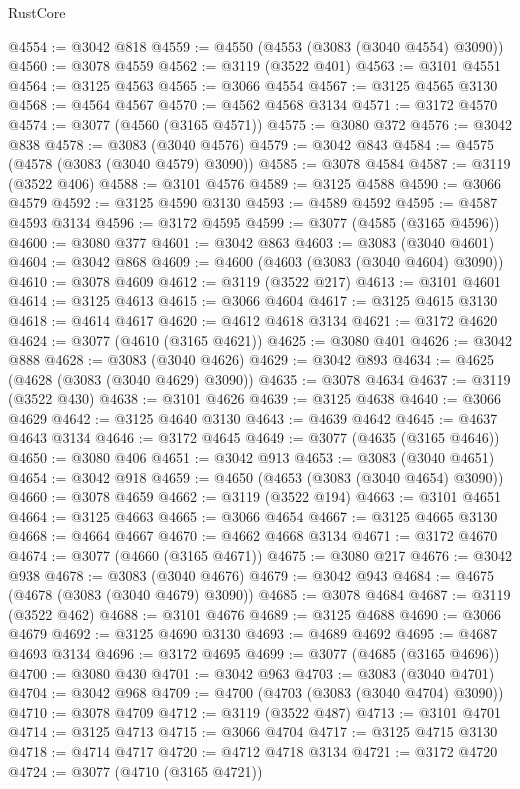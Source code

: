 \begin{lexlean}{RustCore}
\begin{coremodule}
@4554 := @3042 @818
@4559 := @4550 (@4553 (@3083 (@3040 @4554) @3090))
@4560 := @3078 @4559
@4562 := @3119 (@3522 @401)
@4563 := @3101 @4551
@4564 := @3125 @4563
@4565 := @3066 @4554
@4567 := @3125 @4565 @3130
@4568 := @4564 @4567
@4570 := @4562 @4568 @3134
@4571 := @3172 @4570
@4574 := @3077 (@4560 (@3165 @4571))
@4575 := @3080 @372
@4576 := @3042 @838
@4578 := @3083 (@3040 @4576)
@4579 := @3042 @843
@4584 := @4575 (@4578 (@3083 (@3040 @4579) @3090))
@4585 := @3078 @4584
@4587 := @3119 (@3522 @406)
@4588 := @3101 @4576
@4589 := @3125 @4588
@4590 := @3066 @4579
@4592 := @3125 @4590 @3130
@4593 := @4589 @4592
@4595 := @4587 @4593 @3134
@4596 := @3172 @4595
@4599 := @3077 (@4585 (@3165 @4596))
@4600 := @3080 @377
@4601 := @3042 @863
@4603 := @3083 (@3040 @4601)
@4604 := @3042 @868
@4609 := @4600 (@4603 (@3083 (@3040 @4604) @3090))
@4610 := @3078 @4609
@4612 := @3119 (@3522 @217)
@4613 := @3101 @4601
@4614 := @3125 @4613
@4615 := @3066 @4604
@4617 := @3125 @4615 @3130
@4618 := @4614 @4617
@4620 := @4612 @4618 @3134
@4621 := @3172 @4620
@4624 := @3077 (@4610 (@3165 @4621))
@4625 := @3080 @401
@4626 := @3042 @888
@4628 := @3083 (@3040 @4626)
@4629 := @3042 @893
@4634 := @4625 (@4628 (@3083 (@3040 @4629) @3090))
@4635 := @3078 @4634
@4637 := @3119 (@3522 @430)
@4638 := @3101 @4626
@4639 := @3125 @4638
@4640 := @3066 @4629
@4642 := @3125 @4640 @3130
@4643 := @4639 @4642
@4645 := @4637 @4643 @3134
@4646 := @3172 @4645
@4649 := @3077 (@4635 (@3165 @4646))
@4650 := @3080 @406
@4651 := @3042 @913
@4653 := @3083 (@3040 @4651)
@4654 := @3042 @918
@4659 := @4650 (@4653 (@3083 (@3040 @4654) @3090))
@4660 := @3078 @4659
@4662 := @3119 (@3522 @194)
@4663 := @3101 @4651
@4664 := @3125 @4663
@4665 := @3066 @4654
@4667 := @3125 @4665 @3130
@4668 := @4664 @4667
@4670 := @4662 @4668 @3134
@4671 := @3172 @4670
@4674 := @3077 (@4660 (@3165 @4671))
@4675 := @3080 @217
@4676 := @3042 @938
@4678 := @3083 (@3040 @4676)
@4679 := @3042 @943
@4684 := @4675 (@4678 (@3083 (@3040 @4679) @3090))
@4685 := @3078 @4684
@4687 := @3119 (@3522 @462)
@4688 := @3101 @4676
@4689 := @3125 @4688
@4690 := @3066 @4679
@4692 := @3125 @4690 @3130
@4693 := @4689 @4692
@4695 := @4687 @4693 @3134
@4696 := @3172 @4695
@4699 := @3077 (@4685 (@3165 @4696))
@4700 := @3080 @430
@4701 := @3042 @963
@4703 := @3083 (@3040 @4701)
@4704 := @3042 @968
@4709 := @4700 (@4703 (@3083 (@3040 @4704) @3090))
@4710 := @3078 @4709
@4712 := @3119 (@3522 @487)
@4713 := @3101 @4701
@4714 := @3125 @4713
@4715 := @3066 @4704
@4717 := @3125 @4715 @3130
@4718 := @4714 @4717
@4720 := @4712 @4718 @3134
@4721 := @3172 @4720
@4724 := @3077 (@4710 (@3165 @4721))

\end{coremodule}
\end{lexlean}
